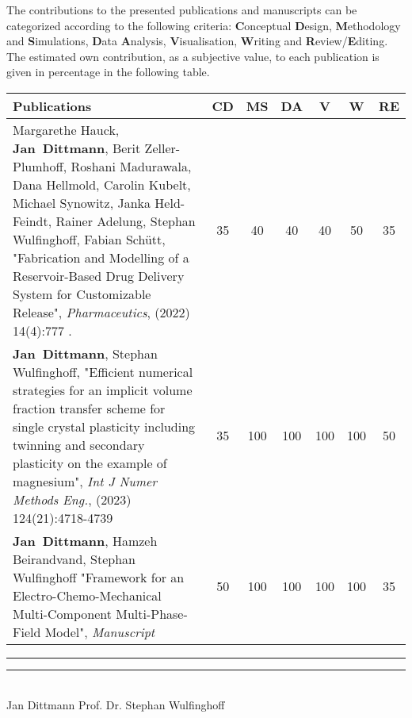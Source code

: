 The contributions to the presented publications and manuscripts can be categorized according to the following criteria: \textbf{C}onceptual \textbf{D}esign, \textbf{M}ethodology and \textbf{S}imulations, \textbf{D}ata \textbf{A}nalysis, \textbf{V}isualisation, \textbf{W}riting and \textbf{R}eview/\textbf{E}diting. The estimated own contribution, as a subjective value, to each publication is given in percentage in the following table.


	\begin{xltabular}{\textwidth}{| L | c | c | c | c | c | c |}
	\hline    
		\textbf{Publications} & \textbf{CD} & \textbf{MS} & \textbf{DA} & \textbf{V} & \textbf{W} & \textbf{RE}\tabularnewline 
		\hline    
Margarethe Hauck, \mbox{\textbf{Jan Dittmann}}, Berit Zeller-Plumhoff, Roshani Madurawala, Dana Hellmold,  Carolin Kubelt, Michael Synowitz, Janka Held-Feindt, Rainer Adelung, Stephan Wulfinghoff, Fabian Schütt, "Fabrication and Modelling of a Reservoir-Based Drug Delivery System for Customizable Release", \textit{Pharmaceutics}, (2022) 14(4):777 .&35&40&40&40&50&35\tabularnewline \hline
\mbox{\textbf{Jan Dittmann}}, Stephan Wulfinghoff, "Efficient numerical strategies for an implicit volume fraction transfer scheme for single crystal plasticity including twinning and secondary plasticity on the example of magnesium", \textit{Int J Numer Methods Eng.}, (2023) 124(21):4718-4739 & 35 & 100 & 100 & 100 & 100 & 50 \\ \hline
\mbox{\textbf{Jan Dittmann}}, Hamzeh Beirandvand, Stephan Wulfinghoff "Framework for an Electro-Chemo-Mechanical Multi-Component Multi-Phase-Field Model", \textit{Manuscript} & 50 & 100 & 100 & 100 & 100 & 35 \\ \hline
\end{xltabular} 
\vspace{4cm}
\rule{5cm}{0.2pt} \hspace{4cm} \rule{5cm}{0.2pt}\\ 
\hspace*{1cm} Jan Dittmann \hspace{5.2cm} Prof. Dr. Stephan Wulfinghoff


